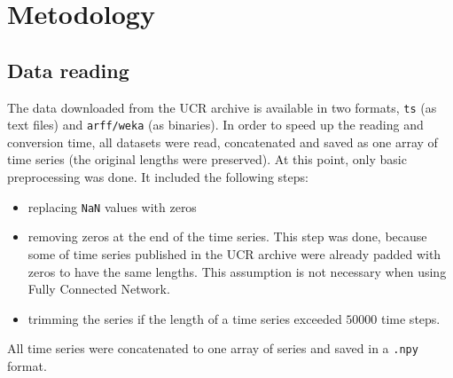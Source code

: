 \documentclass[a4paper,11pt,twoside]{report}
\theoremstyle{definition}
\begin{document}
\chapter{Metodology}
\section{Data reading}
The data downloaded from the UCR archive is available in two formats, \texttt{ts} (as text files) and \texttt{arff/weka} (as binaries). In order to speed up the reading and conversion time, all datasets were read, concatenated and saved as one array of time series (the original lengths were preserved). At this point, only basic preprocessing was done. It included the following steps:
\begin{itemize}
\item replacing \texttt{NaN} values with zeros
\item removing zeros at the end of the time series. This step was done, because some of time series published in the UCR archive were already padded with zeros to have the same lengths. This assumption is not necessary when using Fully Connected Network.
\item trimming the series if the length of a time series exceeded $50 000$ time steps.


\end{itemize}

All time series were concatenated to one array of series and saved in a \texttt{.npy} format.
\end{document}
